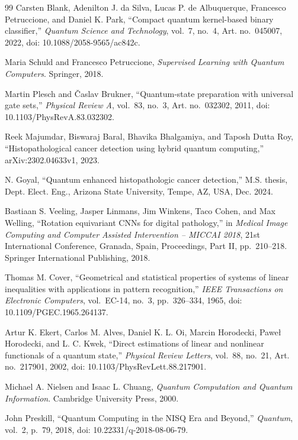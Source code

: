 \documentclass[conference]{IEEEtran}
\begin{document}
\begin{thebibliography}{99}
Carsten Blank, Adenilton J. da Silva, Lucas P. de Albuquerque, Francesco Petruccione, and Daniel K. Park, ``Compact quantum kernel-based binary classifier,'' \emph{Quantum Science and Technology}, vol.~7, no.~4, Art. no.~045007, 2022, doi: 10.1088/2058-9565/ac842c.

Maria Schuld and Francesco Petruccione, \emph{Supervised Learning with Quantum Computers}. Springer, 2018.

Martin Plesch and \v{C}aslav Brukner, ``Quantum-state preparation with universal gate sets,'' \emph{Physical Review A}, vol.~83, no.~3, Art. no.~032302, 2011, doi: 10.1103/PhysRevA.83.032302.

Reek Majumdar, Biswaraj Baral, Bhavika Bhalgamiya, and Taposh Dutta Roy, ``Histopathological cancer detection using hybrid quantum computing,'' arXiv:2302.04633v1, 2023.

N. Goyal, ``Quantum enhanced histopathologic cancer detection,'' M.S. thesis, Dept. Elect. Eng., Arizona State University, Tempe, AZ, USA, Dec. 2024.

Bastiaan S. Veeling, Jasper Linmans, Jim Winkens, Taco Cohen, and Max Welling, ``Rotation equivariant CNNs for digital pathology,'' in \emph{Medical Image Computing and Computer Assisted Intervention -- MICCAI 2018}, 21st International Conference, Granada, Spain, Proceedings, Part II, pp.~210--218. Springer International Publishing, 2018.

Thomas M. Cover, ``Geometrical and statistical properties of systems of linear inequalities with applications in pattern recognition,'' \emph{IEEE Transactions on Electronic Computers}, vol.~EC-14, no.~3, pp.~326--334, 1965, doi: 10.1109/PGEC.1965.264137.

Artur K. Ekert, Carlos M. Alves, Daniel K. L. Oi, Marcin Horodecki, Pawe{\l} Horodecki, and L. C. Kwek, ``Direct estimations of linear and nonlinear functionals of a quantum state,'' \emph{Physical Review Letters}, vol.~88, no.~21, Art. no.~217901, 2002, doi: 10.1103/PhysRevLett.88.217901.

Michael A. Nielsen and Isaac L. Chuang, \emph{Quantum Computation and Quantum Information}. Cambridge University Press, 2000.

John Preskill, ``Quantum Computing in the NISQ Era and Beyond,'' \emph{Quantum}, vol.~2, p.~79, 2018, doi: 10.22331/q-2018-08-06-79.

\end{thebibliography}
\end{document}

